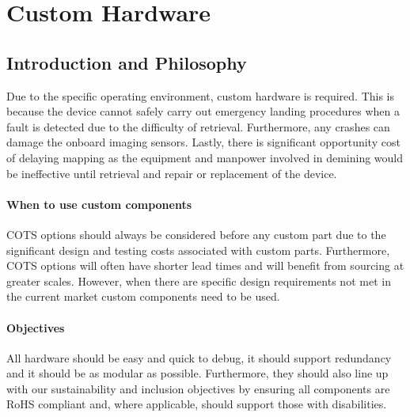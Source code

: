 \newpage
{}
\section{Custom Hardware} \label{section:Custom Hardware}
\subsection{Introduction and Philosophy}
Due to the specific operating environment, custom hardware is required. This is because the device cannot safely carry out emergency landing procedures when a fault is detected due to the difficulty of retrieval. Furthermore, any crashes can damage the onboard imaging sensors. Lastly, there is significant opportunity cost of delaying mapping as the equipment and manpower involved in demining would be ineffective until retrieval and repair or replacement of the device. 

\paragraph{When to use custom components}
\gls{COTS} options should always be considered before any custom part due to the significant design and testing costs associated with custom parts. Furthermore, \gls{COTS} options will often have shorter lead times and will benefit from sourcing at greater scales. However, when there are specific design requirements not met in the current market custom components need to be used.
\paragraph{Objectives}
All hardware should be easy and quick to debug, it should support redundancy and it should be as modular as possible. Furthermore, they should also line up with our sustainability and inclusion objectives by ensuring all components are \gls{RoHS} compliant and, where applicable, should support those with disabilities.



